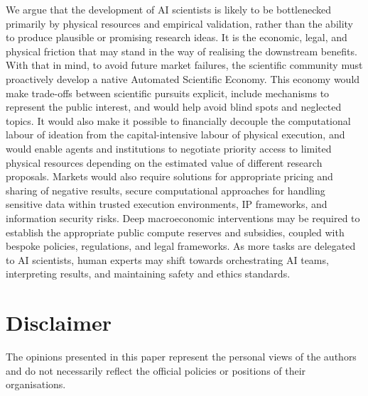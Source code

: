 \documentclass[11pt, a4paper, twocolumn, goog]{google}
\begin{document}
We argue that the development of AI scientists is likely to be bottlenecked primarily by physical resources and empirical validation, rather than the ability to produce plausible or promising research ideas. It is the economic, legal, and physical friction that may stand in the way of realising the downstream benefits. With that in mind, to avoid future market failures, the scientific community must proactively develop a native Automated Scientific Economy. This economy would make trade-offs between scientific pursuits explicit, include mechanisms to represent the public interest, and would help avoid blind spots and neglected topics. It would also make it possible to financially decouple the computational labour of ideation from the capital-intensive labour of physical execution, and would enable agents and institutions to negotiate priority access to limited physical resources depending on the estimated value of different research proposals. Markets would also require solutions for appropriate pricing and sharing of negative results, secure computational approaches for handling sensitive data within trusted execution environments, IP frameworks, and information security risks. Deep macroeconomic interventions may be required to establish the appropriate public compute reserves and subsidies, coupled with bespoke policies, regulations, and legal frameworks. As more tasks are delegated to AI scientists, human experts may shift towards orchestrating AI teams, interpreting results, and maintaining safety and ethics standards.

\section*{Disclaimer}

The opinions presented in this paper represent the personal views of the authors and do not necessarily reflect the official policies or positions of their organisations.



\end{document}
